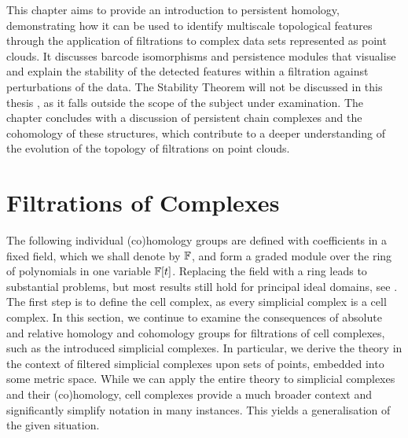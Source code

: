 \label{PersistentHomology}
This chapter aims to provide an introduction to persistent homology, demonstrating how it can be used to identify multiscale topological features through the application of filtrations to complex data sets represented as point clouds. It discusses barcode isomorphisms and persistence modules that visualise and explain the stability of the detected features within a filtration against perturbations of the data. 
The Stability Theorem will not be discussed in this thesis \cite[Theorem 4.20]{chazal2016structure}, as it falls outside the scope of the subject under examination. The chapter concludes with a discussion of persistent chain complexes and the cohomology of these structures, which contribute to a deeper understanding of the evolution of the topology of filtrations on point clouds.

\section{Filtrations of Complexes}
\label{FiltrationsofComplexes}
The following individual (co)homology groups are defined with coefficients in a fixed field, which we shall denote by ${\mathbb{F}}$, and form a graded module over the ring of polynomials in one variable ${\mathbb{F}}[t]$. Replacing the field with a ring leads to substantial problems, but most results still hold for principal ideal domains, see \cite[Theorem 2.1, \S 3.1]{zomorodian2004computing}. The first step is to define the cell complex, as every simplicial complex is a cell complex. In this section, we continue to examine the consequences of absolute and relative homology and cohomology groups for filtrations of cell complexes, such as the introduced simplicial complexes. In particular, we derive the theory in the context of filtered simplicial complexes upon sets of points, embedded into some metric space. While we can apply the entire theory to simplicial complexes and their (co)homology, cell complexes provide a much broader context and significantly simplify notation in many instances. This yields a generalisation of the given situation.

